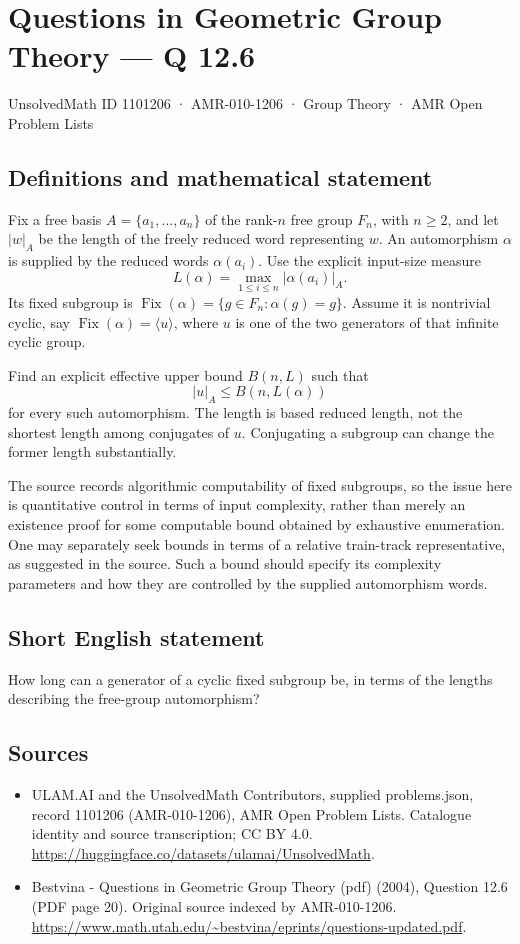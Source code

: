 \documentclass[11pt,a4paper]{article}
\begin{document}
\section*{Questions in Geometric Group Theory — Q 12.6}\label{1101206}
{\small UnsolvedMath ID 1101206 · AMR-010-1206 · Group Theory · AMR Open Problem Lists}
\subsection{Definitions and mathematical statement}
Fix a free basis $A=\{a_1,\ldots,a_n\}$ of the rank-$n$ free group $F_n$, with $n\geq2$, and let $|w|_A$ be the length of the freely reduced word representing $w$. An automorphism $\alpha$ is supplied by the reduced words $\alpha(a_i)$. Use the explicit input-size measure
\[
 L(\alpha)=\max_{1\leq i\leq n}|\alpha(a_i)|_A.
\]
Its fixed subgroup is $\operatorname{Fix}(\alpha)=\{g\in F_n:\alpha(g)=g\}$. Assume it is nontrivial cyclic, say $\operatorname{Fix}(\alpha)=\langle u\rangle$, where $u$ is one of the two generators of that infinite cyclic group.

Find an explicit effective upper bound $B(n,L)$ such that
\[
 |u|_A\leq B(n,L(\alpha))
\]
for every such automorphism. The length is based reduced length, not the shortest length among conjugates of $u$. Conjugating a subgroup can change the former length substantially.

The source records algorithmic computability of fixed subgroups, so the issue here is quantitative control in terms of input complexity, rather than merely an existence proof for some computable bound obtained by exhaustive enumeration. One may separately seek bounds in terms of a relative train-track representative, as suggested in the source. Such a bound should specify its complexity parameters and how they are controlled by the supplied automorphism words.
\subsection{Short English statement}
How long can a generator of a cyclic fixed subgroup be, in terms of the lengths describing the free-group automorphism?
\subsection{Sources}
\begin{itemize}
\item[S1] ULAM.AI and the UnsolvedMath Contributors, supplied problems.json, record 1101206 (AMR-010-1206), AMR Open Problem Lists. Catalogue identity and source transcription; CC BY 4.0.
\url{https://huggingface.co/datasets/ulamai/UnsolvedMath}.
\item[S2] Bestvina - Questions in Geometric Group Theory (pdf) (2004), Question 12.6 (PDF page 20). Original source indexed by AMR-010-1206.
\url{https://www.math.utah.edu/~bestvina/eprints/questions-updated.pdf}.
\end{itemize}
\end{document}
